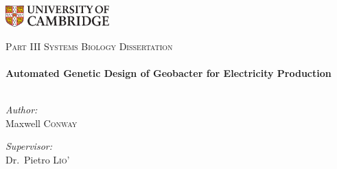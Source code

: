 
\begin{titlepage}
\begin{center}

\begin{flushleft}
\includegraphics[width=0.3\textwidth]{./logo}~\\[1cm]
\end{flushleft}

\textsc{\Large Part III Systems Biology Dissertation}\\[0.5cm]

\HRule \\[0.4cm]
{ \huge \bfseries Automated Genetic Design of Geobacter for Electricity Production}\\[0.4cm]

\HRule \\[1.5cm]

\begin{minipage}{0.4\textwidth}
\begin{flushleft} \large
\emph{Author:}\\
Maxwell \textsc{Conway}
\end{flushleft}
\end{minipage}
\begin{minipage}{0.4\textwidth}
\begin{flushright} \large
\emph{Supervisor:} \\
Dr.~Pietro \textsc{Lio'}
\end{flushright}
\end{minipage}
\vspace{1cm}

\begin{abstract}

\end{abstract}

\end{center}
\end{titlepage}

